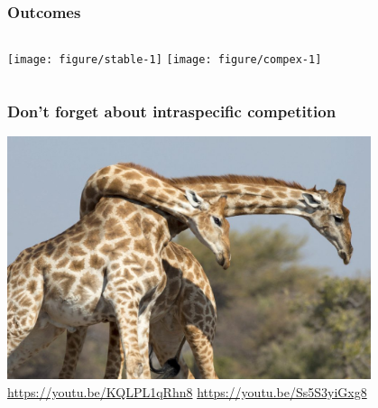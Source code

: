 \documentclass[color=usenames,dvipsnames]{beamer}\usepackage[]{graphicx}\usepackage[]{color}
\begin{document}




\begin{frame}
  \frametitle{Outcomes}
  \vspace{-1cm}


\begin{columns}
  \column{\dimexpr\paperwidth-10pt}
    \texttt{[image: figure/stable-1]}
    \texttt{[image: figure/compex-1]}
\end{columns}
\end{frame}


\begin{frame}
  \frametitle{Don't forget about intraspecific competition}
  \centering 
  \includegraphics[width=0.8\textwidth]{figs/giraffe} \\
  \url{https://youtu.be/KQLPL1qRhn8}
  \url{https://youtu.be/Ss5S3yiGxg8}
\end{frame}
\end{document}
